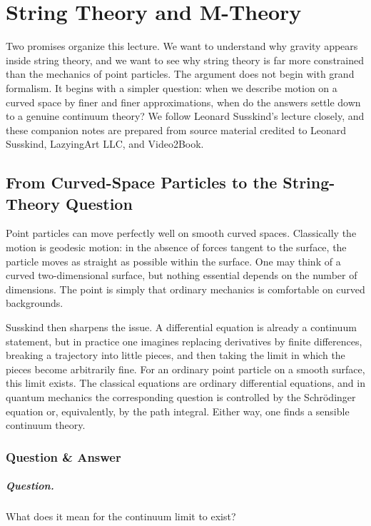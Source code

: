 \chapter{String Theory and M-Theory}

Two promises organize this lecture. We want to understand why gravity appears inside string theory, and we want to see why string theory is far more constrained than the mechanics of point particles. The argument does not begin with grand formalism. It begins with a simpler question: when we describe motion on a curved space by finer and finer approximations, when do the answers settle down to a genuine continuum theory? We follow Leonard Susskind's lecture closely, and these companion notes are prepared from source material credited to Leonard Susskind, LazyingArt LLC, and Video2Book.

\section{From Curved-Space Particles to the String-Theory Question}

Point particles can move perfectly well on smooth curved spaces. Classically the motion is geodesic motion: in the absence of forces tangent to the surface, the particle moves as straight as possible within the surface. One may think of a curved two-dimensional surface, but nothing essential depends on the number of dimensions. The point is simply that ordinary mechanics is comfortable on curved backgrounds.

Susskind then sharpens the issue. A differential equation is already a continuum statement, but in practice one imagines replacing derivatives by finite differences, breaking a trajectory into little pieces, and then taking the limit in which the pieces become arbitrarily fine. For an ordinary point particle on a smooth surface, this limit exists. The classical equations are ordinary differential equations, and in quantum mechanics the corresponding question is controlled by the Schr\"odinger equation or, equivalently, by the path integral. Either way, one finds a sensible continuum theory.

\subsection{Question \& Answer}

\paragraph{Question.} What does it mean for the continuum limit to exist?

